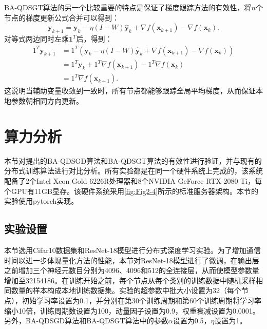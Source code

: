 BA-QDSGT算法的另一个比较重要的特点是保证了梯度跟踪方法的有效性，将$n$个节点的梯度更新公式合并可以得到：
\begin{equation}
    \label{tab:equ-4-15}
    \boldsymbol{y}_{k+1}=\boldsymbol{y}_k-\eta \left( I-W \right) \hat{\boldsymbol{y}}_k+\nabla f\left( \boldsymbol{x}_{k+1} \right) -\nabla f\left( \boldsymbol{x}_k \right) .
\end{equation}
对等式两边同时左乘$\mathbf{1}^T$后，得到：
\begin{equation}
    \label{tab:equ-4-16}
    \begin{aligned}
        1^T\boldsymbol{y}_{k+1}&=1^T\left( \boldsymbol{y}_k-\eta \left( I-W \right) \hat{\boldsymbol{y}}_k+\nabla f\left( \boldsymbol{x}_{k+1} \right) -\nabla f\left( \boldsymbol{x}_k \right) \right) 
        \\
        &=1^T\boldsymbol{y}_k+1^T\nabla f\left( \boldsymbol{x}_{k+1} \right) -1^T\nabla f\left( \boldsymbol{x}_k \right) 
        \\
        &=1^T\nabla f\left( \boldsymbol{x}_{k+1} \right) .
    \end{aligned}
\end{equation}
这说明当辅助变量收敛到一致时，所有节点都能够跟踪全局平均梯度，从而保证本地参数朝相同方向更新。

\section{算力分析}
本节对提出的BA-QDSGD算法和BA-QDSGT算法的有效性进行验证，并与现有的分布式训练算法进行对比分析。所有实验都是在同一个硬件系统上完成的，该系统配备了2个Intel Xeon Gold 6226R处理器和8个NVIDIA GeForce RTX 2080 Ti，每个GPU有11GB显存。该硬件系统采用\autoref{fig:Fig2-4}所示的标准服务器架构。本节的实验使用pytorch实现。

\subsection{实验设置}
本节选用Cifar10数据集和ResNet-18模型进行分布式深度学习实验。为了增加通信时间以进一步体现量化方法的性能，本节对ResNet-18模型进行了微调，在输出层之前增加三个神经元数目分别为4096、4096和512的全连接层，从而使模型参数量增加至32154186。在训练开始之前，每个节点从每个类别的训练数据中随机采样相同数量的样本构成本地训练数据集。实验的超参数中批大小设置为32（每个节点），初始学习率设置为0.1，并分别在第30个训练周期和第60个训练周期将学习率缩小10倍，训练周期数设置为100，动量因子设置为0.9，权重衰减设置为0.0001。另外，BA-QDSGD算法和BA-QDSGT算法中的参数$\alpha$设置为0.5，$\eta$设置为1。

